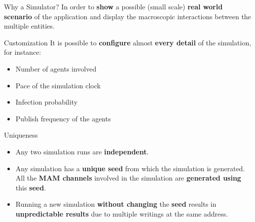 \begin{block}{Why a Simulator?}
    In order to \textbf{show} a possible (small scale) \textbf{real world scenario} of the application and display the macroscopic interactions between the multiple entities.
\end{block}

\begin{block}{Customization}
    It is possible to \textbf{configure} almost \textbf{every detail} of the simulation, for instance:
    \begin{itemize}
        \item Number of agents involved
        \item Pace of the simulation clock
        \item Infection probability
        \item Publish frequency of the agents
    \end{itemize}
\end{block}

\begin{block}{Uniqueness} 
    \begin{itemize}
        \item Any two simulation runs are \textbf{independent}. 
        \item Any simulation has a \textbf{unique seed} from which the simulation is generated. All the \textbf{MAM channels} involved in the simulation are \textbf{generated using} this \textbf{seed}.
        \item Running a new simulation \textbf{without changing} the \textbf{seed} results in \textbf{unpredictable results} due to multiple writings at the same address.
    \end{itemize}
\end{block}
